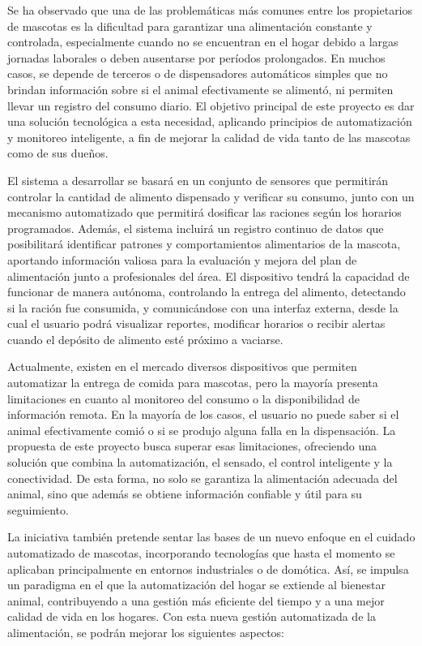 \documentclass[
11pt, %
]{charter}
\begin{document}
Se ha observado que una de las problemáticas más comunes entre los propietarios de mascotas es la dificultad para garantizar una alimentación constante y controlada, especialmente cuando no se encuentran en el hogar debido a largas jornadas laborales o deben ausentarse por períodos prolongados. En muchos casos, se depende de terceros o de dispensadores automáticos simples que no brindan información sobre si el animal efectivamente se alimentó, ni permiten llevar un registro del consumo diario. El objetivo principal de este proyecto es dar una solución tecnológica a esta necesidad, aplicando principios de automatización y monitoreo inteligente, a fin de mejorar la calidad de vida tanto de las mascotas como de sus dueños.

El sistema a desarrollar se basará en un conjunto de sensores que permitirán controlar la cantidad de alimento dispensado y verificar su consumo, junto con un mecanismo automatizado que permitirá dosificar las raciones según los horarios programados. Además, el sistema incluirá un registro continuo de datos que posibilitará identificar patrones y comportamientos alimentarios de la mascota, aportando información valiosa para la evaluación y mejora del plan de alimentación junto a profesionales del área.
El dispositivo tendrá la capacidad de funcionar de manera autónoma, controlando la entrega del alimento, detectando si la ración fue consumida, y comunicándose con una interfaz externa, desde la cual el usuario podrá visualizar reportes, modificar horarios o recibir alertas cuando el depósito de alimento esté próximo a vaciarse.

Actualmente, existen en el mercado diversos dispositivos que permiten automatizar la entrega de comida para mascotas, pero la mayoría presenta limitaciones en cuanto al monitoreo del consumo o la disponibilidad de información remota. En la mayoría de los casos, el usuario no puede saber si el animal efectivamente comió o si se produjo alguna falla en la dispensación.
La propuesta de este proyecto busca superar esas limitaciones, ofreciendo una solución que combina la automatización, el sensado, el control inteligente y la conectividad. De esta forma, no solo se garantiza la alimentación adecuada del animal, sino que además se obtiene información confiable y útil para su seguimiento.

La iniciativa también pretende sentar las bases de un nuevo enfoque en el cuidado automatizado de mascotas, incorporando tecnologías que hasta el momento se aplicaban principalmente en entornos industriales o de domótica. Así, se impulsa un paradigma en el que la automatización del hogar se extiende al bienestar animal, contribuyendo a una gestión más eficiente del tiempo y a una mejor calidad de vida en los hogares.
Con esta nueva gestión automatizada de la alimentación, se podrán mejorar los siguientes aspectos:
\end{document}
